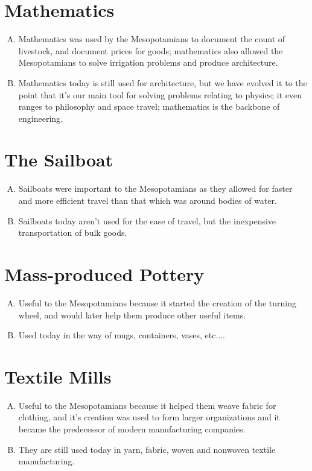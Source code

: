 \documentclass[12pt]{article}
\begin{document}
\section{Mathematics}
\begin{enumerate}[A.]
    \item{Mathematics was used by the Mesopotamians to document the count of
        livestock, and document prices for goods; mathematics also allowed the
        Mesopotamians to solve irrigation problems and produce architecture.}
    \item{Mathematics today is still used for architecture, but we have evolved
        it to the point that it's our main tool for solving problems relating
        to physics; it even ranges to philosophy and space travel; mathematics is
        the backbone of engineering.}
\end{enumerate}

\section{The Sailboat}
\begin{enumerate}[A.]
    \item{Sailboats were important to the Mesopotamians as they allowed for
        faster and more efficient travel than that which was around bodies of
        water.}
    \item{Sailboats today aren't used for the ease of travel, but the
        inexpensive transportation of bulk goods.}
\end{enumerate}

\section{Mass-produced Pottery}
\begin{enumerate}[A.]
    \item{Useful to the Mesopotamians because it started the creation of the
        turning wheel, and would later help them produce other useful items.}
    \item{Used today in the way of mugs, containers, vases, etc....}
\end{enumerate}

\section{Textile Mills}
\begin{enumerate}[A.]
    \item{Useful to the Mesopotamians because it helped them weave fabric for
        clothing, and it’s creation was used to form larger organizations and
        it became the predecessor of modern manufacturing companies.}
    \item{They are still used today in yarn, fabric, woven and nonwoven textile
        manufacturing.}
\end{enumerate}
\end{document}

